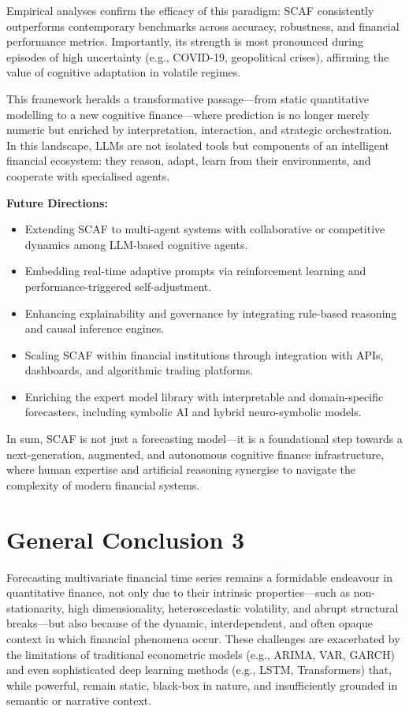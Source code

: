\documentclass[conference]{IEEEtran}
\begin{document}
Empirical analyses confirm the efficacy of this paradigm: SCAF consistently outperforms contemporary benchmarks across accuracy, robustness, and financial performance metrics. Importantly, its strength is most pronounced during episodes of high uncertainty (e.g., COVID-19, geopolitical crises), affirming the value of cognitive adaptation in volatile regimes.

This framework heralds a transformative passage—from static quantitative modelling to a new cognitive finance—where prediction is no longer merely numeric but enriched by interpretation, interaction, and strategic orchestration. In this landscape, LLMs are not isolated tools but components of an intelligent financial ecosystem: they reason, adapt, learn from their environments, and cooperate with specialised agents.

\textbf{Future Directions:}
\begin{itemize}
    \item Extending SCAF to multi-agent systems with collaborative or competitive dynamics among LLM-based cognitive agents.
    \item Embedding real-time adaptive prompts via reinforcement learning and performance-triggered self-adjustment.
    \item Enhancing explainability and governance by integrating rule-based reasoning and causal inference engines.
    \item Scaling SCAF within financial institutions through integration with APIs, dashboards, and algorithmic trading platforms.
    \item Enriching the expert model library with interpretable and domain-specific forecasters, including symbolic AI and hybrid neuro-symbolic models.
\end{itemize}

In sum, SCAF is not just a forecasting model—it is a foundational step towards a next-generation, augmented, and autonomous cognitive finance infrastructure, where human expertise and artificial reasoning synergise to navigate the complexity of modern financial systems.
\section{General Conclusion 3}

Forecasting multivariate financial time series remains a formidable endeavour in quantitative finance, not only due to their intrinsic properties—such as non-stationarity, high dimensionality, heteroscedastic volatility, and abrupt structural breaks—but also because of the dynamic, interdependent, and often opaque context in which financial phenomena occur. These challenges are exacerbated by the limitations of traditional econometric models (e.g., ARIMA, VAR, GARCH) and even sophisticated deep learning methods (e.g., LSTM, Transformers) that, while powerful, remain static, black-box in nature, and insufficiently grounded in semantic or narrative context.
\end{document}

